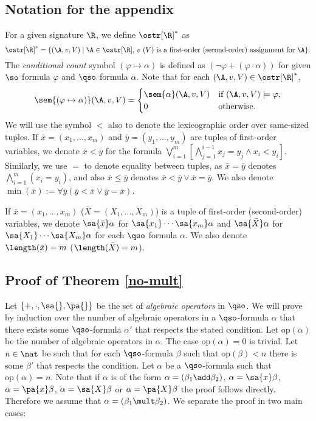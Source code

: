 

\subsection{Notation for the appendix}

For a given signature $\R$, we define $\ostr[\R]^*$ as $$\ostr[\R]^* = \{(\A,v,V) \mid \A\in\ostr[\R]\text{, $v$ ($V$) is a first-order (second-order) assignment for $\A$}  \}.$$
The {\em conditional count} symbol $(\varphi \mapsto \alpha)$ is defined as $(\neg\varphi + (\varphi\cdot\alpha))$ for given $\so$ formula $\varphi$ and $\qso$ formula $\alpha$. Note that for each $(\A,v,V) \in \ostr[\R]^*$, 
$$
\sem{(\varphi \mapsto \alpha)}(\A,v,V) = 
\begin{cases}
\sem{\alpha}(\A,v,V) &\text{if } (\A,v,V)\models\varphi,\\
0 &\text{otherwise}.
\end{cases}
$$
We will use the symbol $<$ also to denote the lexicographic order over same-sized tuples. If $\bar{x} = (x_1,\ldots,x_m)$ and $\bar{y} = (y_1,\ldots,y_m)$ are tuples of first-order variables, we denote $\bar{x} < \bar{y}$ for the formula $\bigvee_{i = 1}^m[\bigwedge_{j = 1}^{i-1}x_j = y_j \wedge x_i < y_i]$. Similarly, we use $=$ to denote equality between tuples, as $\bar{x} = \bar{y}$ denotes $\bigwedge_{i = 1}^m(x_i = y_i)$, and also $\bar{x}\leq\bar{y}$ denotes $\bar{x} < \bar{y} \vee \bar{x} = \bar{y}$. We also denote $\min(\bar{x}) := \forall\bar{y}(\bar{y} < \bar{x}\vee \bar{y} = \bar{x})$.

If $\bar{x} = (x_1,\ldots,x_m)$ ($\bar{X} = (X_1,\ldots,X_m)$) is a tuple of first-order (second-order) variables, we denote $\sa{\bar{x}}\alpha$ for $\sa{x_1}\cdots\sa{x_m}\alpha$ and $\sa{\bar{X}}\alpha$ for $\sa{X_1}\cdots\sa{X_m}\alpha$ for each $\qso$ formula $\alpha$. We also denote $\length(\bar{x}) = m$ ($\length(\bar{X}) = m$).
\subsection*{Proof of Theorem \ref{no-mult}}



Let $\{+, \cdot, \sa{}, \pa{}\}$ be the set of {\it algebraic operators} in $\qso$. We will prove by induction over the number of algebraic operators in a $\qso$-formula $\alpha$ that there exists some $\qso$-formula $\alpha'$ that respects the stated condition. Let $\text{op}(\alpha)$ be the number of algebraic operators in $\alpha$. The case $\text{op}(\alpha) = 0$ is trivial. Let $n\in\nat$ be such that for each $\qso$-formula $\beta$ such that $\text{op}(\beta) < n$ there is some $\beta'$ that respects the condition. Let $\alpha$ be a $\qso$-formula such that $\text{op}(\alpha) = n$. Note that if $\alpha$ is of the form $\alpha = (\beta_1 \add \beta_2)$, $\alpha = \sa{x} \beta$, $\alpha = \pa{x} \beta$, $\alpha = \sa{X} \beta$ or $\alpha = \pa{X} \beta$ the proof follows directly. Therefore we assume that $\alpha = (\beta_1 \mult \beta_2)$. We separate the proof in two main cases:

